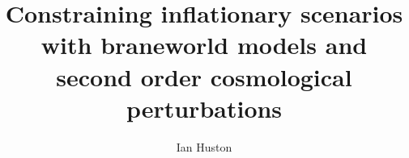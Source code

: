 \renewcommand{\CVSrevision}{\version$Id: title.tex,v 1.6 2009/10/15 18:05:07 ith Exp $}
% 
% 
% 
% 
% 
% 
% 
% 
\title{Constraining inflationary scenarios with braneworld models and second order cosmological
perturbations}
% 
% 
\author{Ian Huston}
% 
% 
% 
\maketitle